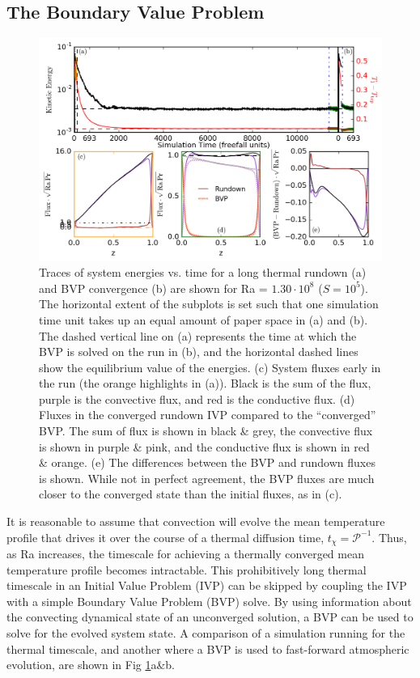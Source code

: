 \documentclass[aps, pre, onecolumn, nofootinbib, notitlepage, groupedaddress, amsfonts, amssymb, amsmath, longbibliography]{revtex4-1}
\begin{document}
\subsection{The Boundary Value Problem}
\begin{figure}[t]
\includegraphics[width=\textwidth]{./figs/time_trace.png}
\caption{Traces of system energies vs. time for a long thermal rundown (a) and BVP convergence
(b) are shown for Ra = $1.30 \cdot 10^8$ ($S = 10^5$).  The horizontal extent of the subplots is set
such that one simulation time unit takes up an equal amount of paper space in (a) and (b).
The dashed vertical line on (a) represents the time at which the BVP is solved on the run in (b),
and the horizontal dashed lines show the equilibrium value of the energies.
(c) System fluxes early in the run (the orange highlights in (a)).  Black is the sum of the flux, purple
is the convective flux, and red is the conductive flux.
(d) Fluxes in the converged rundown IVP compared to the ``converged'' BVP.  The sum of flux is shown in
black \& grey, the convective flux is shown in purple \& pink, and the conductive flux is shown in red \& orange.
(e) The differences between the BVP and rundown fluxes is shown.  While not in perfect agreement, the BVP fluxes
are much closer to the converged state than the initial fluxes, as in (c).
\label{fig:time_trace} }
\end{figure}

It is reasonable to assume that convection will evolve the mean temperature profile that
drives it over the course of a thermal diffusion time, $t_\chi = \mathcal{P}^{-1}$. Thus, as Ra
increases, the timescale for achieving a thermally converged mean temperature profile becomes intractable.
This prohibitively long thermal timescale in an Initial Value Problem (IVP)
can be skipped by coupling the IVP with a simple Boundary Value Problem
(BVP) solve. By using information about the convecting dynamical state of an unconverged solution,
a BVP can be used to solve for the evolved system state.
A comparison of a simulation running for the thermal timescale, and another where a BVP is used
to fast-forward atmospheric evolution, are shown in Fig \ref{fig:time_trace}a\&b.
\end{document}
